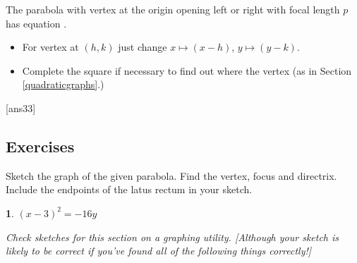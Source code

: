 \documentclass{amsbook}
\newtheorem{exc}{}
\newenvironment{ex}{\begin{exc}\normalfont}{\end{exc}}
\numberwithin{section}{chapter}
\numberwithin{equation}{chapter}
\newcommand{\qi}[1]{\begin{itemize}\item #1 \end{itemize}}
\begin{document}
The parabola with vertex at the origin opening left or right with focal length $p$ has equation .

\qi{For vertex at $(h,k)$ just change $x\mapsto(x-h)$, $y\mapsto(y-k)$.}
\qi{Complete the square if necessary to find out where the vertex (as in Section \ref{quadraticgraphs}.)}

[ans33]
\subsection*{Exercises \nopunct} \hfill

Sketch the graph of the given parabola.  Find the vertex, focus and directrix.  Include the endpoints of the latus rectum in your sketch.
\begin{multicols}{2}
\begin{ex}
	$(x - 3)^{2} = -16y$
	\begin{sol}
		Check sketches for this section on a graphing utility. [Although your sketch is likely to be correct if you've found all of the following things correctly!]
		

\end{sol}
\end{ex}
\end{multicols}
\end{document}
